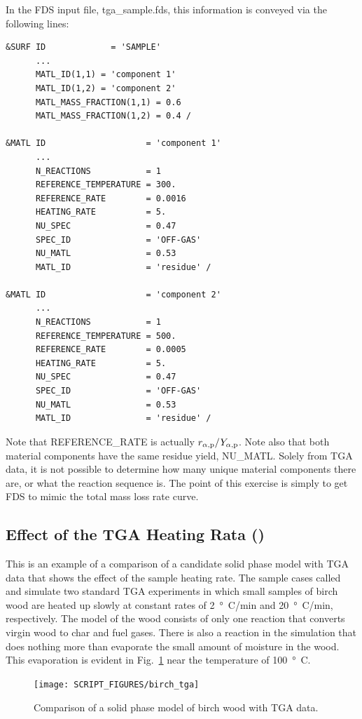 \documentclass[11pt]{book}
\begin{document}
In the FDS input file, {\ct tga\_sample.fds}, this information is conveyed via the following lines:
\begin{lstlisting}
&SURF ID             = 'SAMPLE'
      ...
      MATL_ID(1,1) = 'component 1'
      MATL_ID(1,2) = 'component 2'
      MATL_MASS_FRACTION(1,1) = 0.6
      MATL_MASS_FRACTION(1,2) = 0.4 /

&MATL ID                    = 'component 1'
      ...
      N_REACTIONS           = 1
      REFERENCE_TEMPERATURE = 300.
      REFERENCE_RATE        = 0.0016
      HEATING_RATE          = 5.
      NU_SPEC               = 0.47
      SPEC_ID               = 'OFF-GAS'
      NU_MATL               = 0.53
      MATL_ID               = 'residue' /

&MATL ID                    = 'component 2'
      ...
      N_REACTIONS           = 1
      REFERENCE_TEMPERATURE = 500.
      REFERENCE_RATE        = 0.0005
      HEATING_RATE          = 5.
      NU_SPEC               = 0.47
      SPEC_ID               = 'OFF-GAS'
      NU_MATL               = 0.53
      MATL_ID               = 'residue' /
\end{lstlisting}
Note that {\ct REFERENCE\_RATE} is actually $r_{\alpha,{\rm p}}/Y_{\alpha,{\rm p}}$. Note also that both material components have the same residue yield, {\ct NU\_MATL}. Solely from TGA data, it is not possible to determine how many unique material components there are, or what the reaction sequence is. The point of this exercise is simply to get FDS to mimic the total mass loss rate curve.


\subsection{Effect of the TGA Heating Rata (\texorpdfstring{}{birch\_tga})}
\label{birch_tga}

This is an example of a comparison of a candidate solid phase model with TGA data that shows the effect of the sample heating rate. The sample cases called  and  simulate two standard TGA experiments in which small samples of birch wood are heated up slowly at constant rates of 2~\si{\degree C}/min and 20~\si{\degree C}/min, respectively. The model of the wood consists of only one reaction that converts virgin wood to char and fuel gases. There is also a reaction in the simulation that does nothing more than evaporate the small amount of moisture in the wood. This evaporation is evident in Fig.~\ref{fig_birch_tga} near the temperature of 100~\si{\degree C}.
\begin{figure}[!htb]
\centering
\texttt{[image: SCRIPT\_FIGURES/birch\_tga]}
\caption[An example of TGA data]{\label{fig_birch_tga} Comparison of a solid phase model of birch wood with TGA data.}
\end{figure}
\end{document}
